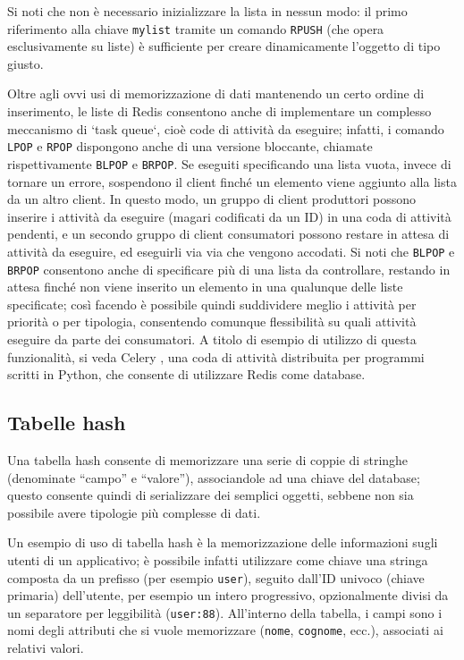 Si noti che non è necessario inizializzare la lista in nessun modo: il primo riferimento alla chiave
\verb|mylist| tramite un comando \verb|RPUSH| (che opera esclusivamente su liste) è sufficiente
per creare dinamicamente l'oggetto di tipo giusto.

Oltre agli ovvi usi di memorizzazione di dati mantenendo un certo ordine di inserimento, le liste
di Redis consentono anche di implementare un complesso meccanismo di `task queue`, cioè code di 
attività da eseguire; infatti, i comando \verb|LPOP| e \verb|RPOP| dispongono anche di una versione
bloccante, chiamate rispettivamente \verb|BLPOP| e \verb|BRPOP|. Se eseguiti specificando una lista
vuota, invece di tornare un errore, sospendono il client finché un elemento viene aggiunto alla
lista da un altro client. In questo modo, un gruppo di client produttori possono inserire i attività
da eseguire (magari codificati da un ID) in una coda di attività pendenti, e un secondo gruppo di
client consumatori possono restare in attesa di attività da eseguire, ed eseguirli via via che 
vengono accodati. Si noti che \verb|BLPOP| e \verb|BRPOP| consentono anche di specificare più di
una lista da controllare, restando in attesa finché non viene inserito un elemento in una qualunque
delle liste specificate; così facendo è possibile quindi suddividere meglio i attività per priorità
o per tipologia, consentendo comunque flessibilità su quali attività eseguire da parte dei
consumatori. A titolo di esempio di utilizzo di questa funzionalità, si veda Celery \cite{celery},
una coda di attività distribuita per programmi scritti in Python, che consente di utilizzare Redis
come database.


\subsection{Tabelle hash}

Una tabella hash consente di memorizzare una serie di coppie di stringhe (denominate ``campo'' e
``valore''), associandole ad una chiave del database; questo consente quindi di serializzare dei
semplici oggetti, sebbene non sia possibile avere tipologie più complesse di dati.

Un esempio di uso di tabella hash è la memorizzazione delle informazioni sugli utenti di un
applicativo; è possibile infatti utilizzare come chiave una stringa composta da un prefisso (per
esempio \verb|user|), seguito dall'ID univoco (chiave primaria) dell'utente, per esempio un intero
progressivo, opzionalmente divisi da un separatore per leggibilità (\verb|user:88|). All'interno
della tabella, i campi sono i nomi degli attributi che si vuole memorizzare (\verb|nome|,
\verb|cognome|, ecc.), associati ai relativi valori.

